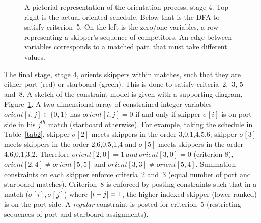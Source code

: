 \documentclass{llncs}
\DeclarePairedDelimiter\abs{\lvert}{\rvert}
\begin{document}
\begin{figure}[tb]
    \caption{A pictorial representation of the orientation process, stage 4. Top right is the actual
        oriented schedule. Below that is the DFA to satisfy criterion~5. On the left is the zero/one
        variables, a row representing a skipper's sequence of competitors. An edge between variables
        corresponds to a matched pair, that must take different values.}\label{oriented}
\end{figure}

The final stage, stage 4, orients skippers within matches, such that they are either port (red) or
starboard (green). This is done to satisfy criteria~2,~3, 5 and~8. A sketch of the constraint
model is given with a supporting diagram, Figure~\ref{oriented}.  A two dimensional array 
of constrained integer variables $orient[i,j] \in \{0,1\}$ has $orient[i,j] = 0$ if and only if skipper $\sigma[i]$ is on port side in his $j^{th}$ match (starboard otherwise).
For example, taking the schedule in Table~\ref{tab2}, skipper 
$\sigma[{2}]$ meets skippers in the order 3,0,1,4,5,6; skipper 
$\sigma[3]$ meets skippers in the order 2,6,0,5,1,4 and 
$\sigma[{5}]$ meets skippers in the order 4,6,0,1,3,2.  Therefore
$orient[2,0] = 1 ~and~ orient[3,0] = 0$ (criterion 8),
$orient[2,4] \neq orient[5,5]$ and
$orient[3,3] \neq orient[5,4]$.
Summation constraints on each skipper enforce
criteria~2 and~3 (equal number of port and starboard matches). Criterion~8 is enforced by posting
constraints such that in a match ($\sigma[{i}],\sigma[{j}]$) where $\abs*{i - j} = 1$, the higher 
indexed skipper (lower ranked) is on the port side. A \emph{regular} constraint is posted for criterion~5
(restricting sequences of port and starboard assignments).
\end{document}
